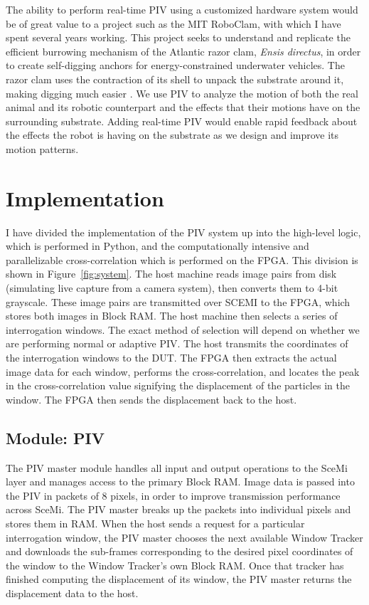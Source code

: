 \documentclass{article}
\begin{document}
	The ability to perform real-time PIV using a customized hardware system would be of great value to a project such as the MIT RoboClam, with which I have spent several years working. This project seeks to understand and replicate the efficient burrowing mechanism of the Atlantic razor clam, \emph{Ensis directus}, in order to create self-digging anchors for energy-constrained underwater vehicles. The razor clam uses the contraction of its shell to unpack the substrate around it, making digging much easier \citep{Winter:2012hj}. We use PIV to analyze the motion of both the real animal and its robotic counterpart and the effects that their motions have on the surrounding substrate. Adding real-time PIV would enable rapid feedback about the effects the robot is having on the substrate as we design and improve its motion patterns. 

	\section{Implementation}
	I have divided the implementation of the PIV system up into the high-level logic, which is performed in Python, and the computationally intensive and parallelizable cross-correlation which is performed on the FPGA. This division is shown in Figure~\ref{fig:system}. The host machine reads image pairs from disk (simulating live capture from a camera system), then converts them to 4-bit grayscale. These image pairs are transmitted over SCEMI to the FPGA, which stores both images in Block RAM. The host machine then selects a series of interrogation windows. The exact method of selection will depend on whether we are performing normal or adaptive PIV. The host transmits the coordinates of the interrogation windows to the DUT. The FPGA then extracts the actual image data for each window, performs the cross-correlation, and locates the peak in the cross-correlation value signifying the displacement of the particles in the window. The FPGA then sends the displacement back to the host. 

	\subsection{Module: PIV}
	The PIV master module handles all input and output operations to the SceMi layer and manages access to the primary Block RAM. Image data is passed into the PIV in packets of 8 pixels, in order to improve transmission performance across SceMi. The PIV master breaks up the packets into individual pixels and stores them in RAM. When the host sends a request for a particular interrogation window, the PIV master chooses the next available Window Tracker and downloads the sub-frames corresponding to the desired pixel coordinates of the window to the Window Tracker's own Block RAM. Once that tracker has finished computing the displacement of its window, the PIV master returns the displacement data to the host.
\end{document}
